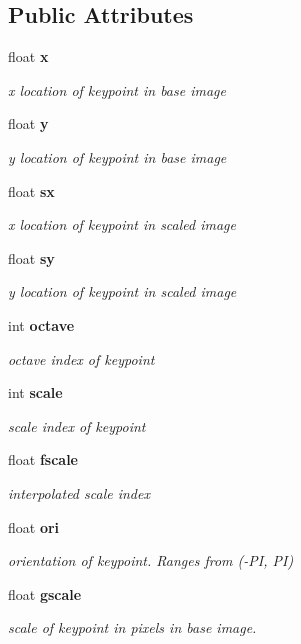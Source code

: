 \subsection*{Public Attributes}
\begin{DoxyCompactItemize}
\item 
float {\bf x}
\begin{DoxyCompactList}\small\item\em x location of keypoint in base image \end{DoxyCompactList}\item 
float {\bf y}
\begin{DoxyCompactList}\small\item\em y location of keypoint in base image \end{DoxyCompactList}\item 
float {\bf sx}
\begin{DoxyCompactList}\small\item\em x location of keypoint in scaled image \end{DoxyCompactList}\item 
float {\bf sy}
\begin{DoxyCompactList}\small\item\em y location of keypoint in scaled image \end{DoxyCompactList}\item 
int {\bf octave}
\begin{DoxyCompactList}\small\item\em octave index of keypoint \end{DoxyCompactList}\item 
int {\bf scale}
\begin{DoxyCompactList}\small\item\em scale index of keypoint \end{DoxyCompactList}\item 
float {\bf fscale}
\begin{DoxyCompactList}\small\item\em interpolated scale index \end{DoxyCompactList}\item 
float {\bf ori}
\begin{DoxyCompactList}\small\item\em orientation of keypoint. Ranges from (-\/\+PI, PI) \end{DoxyCompactList}\item 
float {\bf gscale}
\begin{DoxyCompactList}\small\item\em scale of keypoint in pixels in base image. \end{DoxyCompactList}\item 

\end{DoxyCompactItemize}
